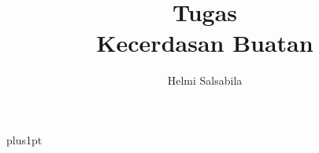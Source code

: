 \documentclass[12pt]{ociamthesis}  %
\title{Tugas \\[1ex]     %
        Kecerdasan Buatan}   %
\author{Helmi Salsabila}             %
\begin{document}
\baselineskip=18pt plus1pt

\setcounter{secnumdepth}{3}
\setcounter{tocdepth}{3}


\maketitle                  %

\begin{romanpages}          %
    \tableofcontents            %
    \listoffigures              %
\end{romanpages}            %


% 
% 
% 
% 
% 
% 
% 
% 
% 
% 
% 
% 
% 

% 
% 

\end{document}
